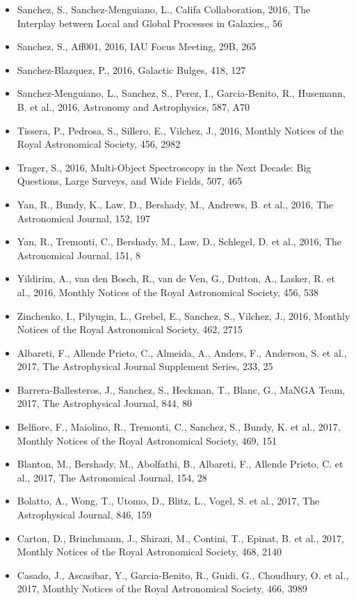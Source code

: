 \documentclass{letter}
\begin{document}
\begin{enumerate}
\begin{itemize}
\item Sanchez, S., Sanchez-Menguiano, L., Califa Collaboration, 2016, The Interplay between Local and Global Processes in Galaxies,, 56
\item Sanchez, S., Aff001, 2016, IAU Focus Meeting, 29B, 265
\item Sanchez-Blazquez, P., 2016, Galactic Bulges, 418, 127
\item Sanchez-Menguiano, L., Sanchez, S., Perez, I., Garcia-Benito, R., Husemann, B. et al., 2016, Astronomy and Astrophysics, 587, A70
\item Tissera, P., Pedrosa, S., Sillero, E., Vilchez, J., 2016, Monthly Notices of the Royal Astronomical Society, 456, 2982
\item Trager, S., 2016, Multi-Object Spectroscopy in the Next Decade: Big Questions, Large Surveys, and Wide Fields, 507, 465
\item Yan, R., Bundy, K., Law, D., Bershady, M., Andrews, B. et al., 2016, The Astronomical Journal, 152, 197
\item Yan, R., Tremonti, C., Bershady, M., Law, D., Schlegel, D. et al., 2016, The Astronomical Journal, 151, 8
\item Yildirim, A., van den Bosch, R., van de Ven, G., Dutton, A., Lasker, R. et al., 2016, Monthly Notices of the Royal Astronomical Society, 456, 538
\item Zinchenko, I., Pilyugin, L., Grebel, E., Sanchez, S., Vilchez, J., 2016, Monthly Notices of the Royal Astronomical Society, 462, 2715
\item Albareti, F., Allende Prieto, C., Almeida, A., Anders, F., Anderson, S. et al., 2017, The Astrophysical Journal Supplement Series, 233, 25
\item Barrera-Ballesteros, J., Sanchez, S., Heckman, T., Blanc, G., MaNGA Team, 2017, The Astrophysical Journal, 844, 80
\item Belfiore, F., Maiolino, R., Tremonti, C., Sanchez, S., Bundy, K. et al., 2017, Monthly Notices of the Royal Astronomical Society, 469, 151
\item Blanton, M., Bershady, M., Abolfathi, B., Albareti, F., Allende Prieto, C. et al., 2017, The Astronomical Journal, 154, 28
\item Bolatto, A., Wong, T., Utomo, D., Blitz, L., Vogel, S. et al., 2017, The Astrophysical Journal, 846, 159
\item Carton, D., Brinchmann, J., Shirazi, M., Contini, T., Epinat, B. et al., 2017, Monthly Notices of the Royal Astronomical Society, 468, 2140
\item Casado, J., Ascasibar, Y., Garcia-Benito, R., Guidi, G., Choudhury, O. et al., 2017, Monthly Notices of the Royal Astronomical Society, 466, 3989

\end{itemize}
\end{enumerate}
\end{document}
